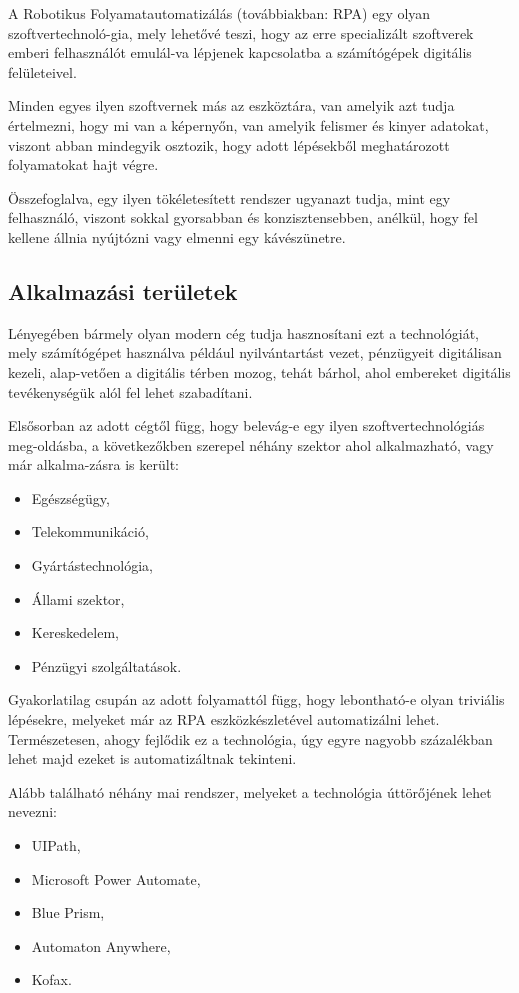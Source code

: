 
A Robotikus Folyamatautomatizálás (továbbiakban: RPA) egy olyan szoftvertechnoló\hyp{}gia, mely lehetővé teszi, hogy az erre specializált szoftverek emberi felhasználót emulál\hyp{}va lépjenek kapcsolatba a számítógépek digitális felületeivel.

Minden egyes ilyen szoftvernek más az eszköztára, van amelyik azt tudja értelmezni, hogy mi van a képernyőn, van amelyik felismer és kinyer adatokat, viszont abban mindegyik osztozik, hogy adott lépésekből meghatározott folyamatokat hajt végre.

Összefoglalva, egy ilyen tökéletesített rendszer ugyanazt tudja, mint egy felhasználó, viszont sokkal gyorsabban és konzisztensebben, anélkül, hogy fel kellene állnia nyújtózni vagy elmenni egy kávészünetre.

\subsection{Alkalmazási területek}

Lényegében bármely olyan modern cég tudja hasznosítani ezt a technológiát, mely számítógépet használva például nyilvántartást vezet, pénzügyeit digitálisan kezeli, alap\hyp{}vetően a digitális térben mozog, tehát bárhol, ahol embereket digitális tevékenységük alól fel lehet szabadítani.

Elsősorban az adott cégtől függ, hogy belevág-e egy ilyen szoftvertechnológiás meg\hyp{}oldásba, a következőkben szerepel néhány szektor ahol alkalmazható, vagy már alkalma\hyp{}zásra is került:
\begin{itemize}
	\item Egészségügy,
	\item Telekommunikáció,
	\item Gyártástechnológia,
	\item Állami szektor,
	\item Kereskedelem,
	\item Pénzügyi szolgáltatások.
\end{itemize}

Gyakorlatilag csupán az adott folyamattól függ, hogy lebontható-e olyan triviális lépésekre, melyeket már az RPA eszközkészletével automatizálni lehet. Természetesen, ahogy fejlődik ez a technológia, úgy egyre nagyobb százalékban lehet majd ezeket is automatizáltnak tekinteni.

Alább található néhány mai rendszer, melyeket a technológia úttörőjének lehet nevezni:
\begin{itemize}
	\item UIPath,
	\item Microsoft Power Automate,
	\item Blue Prism,
	\item Automaton Anywhere,
	\item Kofax.
\end{itemize}

